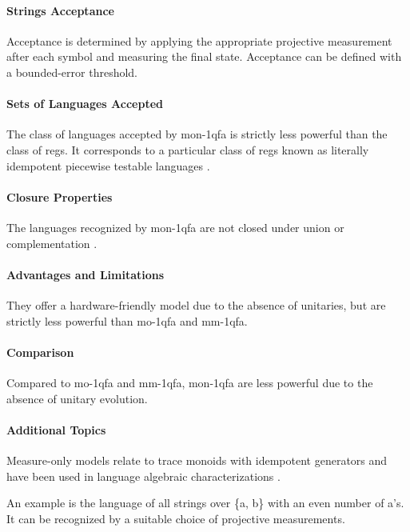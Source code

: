\paragraph{Strings Acceptance}
Acceptance is determined by applying the appropriate projective measurement after each symbol and measuring the final state. Acceptance can be defined with a bounded-error threshold.

\paragraph{Sets of Languages Accepted}
The class of languages accepted by \gls{mon-1qfa} is strictly less powerful than the class of \glspl{reg}. It corresponds to a particular class of \glspl{reg} known as literally idempotent piecewise testable languages \cite{bertoni2010trace}.

\paragraph{Closure Properties}
The languages recognized by \gls{mon-1qfa} are not closed under union or complementation \cite{bertoni2010trace}.

\paragraph{Advantages and Limitations}
They offer a hardware-friendly model due to the absence of unitaries, but are strictly less powerful than \gls{mo-1qfa} and \gls{mm-1qfa}.

\paragraph{Comparison}
Compared to \gls{mo-1qfa} and \gls{mm-1qfa}, \gls{mon-1qfa} are less powerful due to the absence of unitary evolution.

\paragraph{Additional Topics}
Measure-only models relate to trace monoids with idempotent generators and have been used in language algebraic characterizations \cite{comin2013extended, bertoni2010trace}.

\begin{example}
An example is the language of all strings over \{a, b\} with an even number of a's. It can be recognized by a suitable choice of projective measurements.
\end{example}

